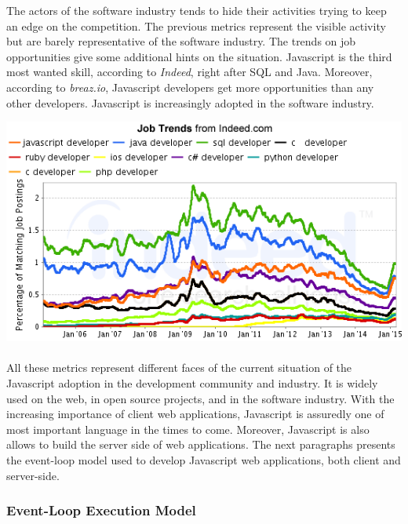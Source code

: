 The actors of the software industry tends to hide their activities trying to keep an edge on the competition.
The previous metrics represent the visible activity but are barely representative of the software industry.
The trends on job opportunities give some additional hints on the situation.
Javascript is the third most wanted skill, according to \textit{Indeed}, right after SQL and Java.
Moreover, according to \textit{breaz.io}, Javascript developers get more opportunities than any other developers.
Javascript is increasingly adopted in the software industry.

\includegraphics[width=0.9\linewidth]{../../data/js-trends/jobgraph}

\paragraph{}

All these metrics represent different faces of the current situation of the Javascript adoption in the development community and industry.
It is widely used on the web, in open source projects, and in the software industry.
With the increasing importance of client web applications, Javascript is assuredly one of most important language in the times to come.
Moreover, Javascript is also allows to build the server side of web applications.
The next paragraphs presents the event-loop model used to develop Javascript web applications, both client and server-side.

\subsubsection{Event-Loop Execution Model} \label{chapter2:web-as-a-platform:javascript:event-loop}

